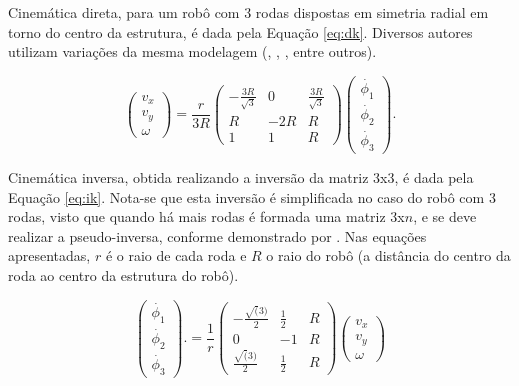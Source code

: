 Cinemática direta, para um robô com 3 rodas dispostas em simetria radial em torno do centro da estrutura, é dada pela Equação \ref{eq:dk}. Diversos autores utilizam variações da mesma modelagem (\cite{rojas2006holonomic}, \cite{ritter2016modelagem}, \cite{pin1994new}, entre outros).

\begin{equation}
  \begin{pmatrix}
    v_x \\
    v_y \\
    \omega
  \end{pmatrix}
  =
  \frac{r}{3R}
  \begin{pmatrix}
    -\frac{3R}{\sqrt{3}} & 0   & \frac{3R}{\sqrt{3}} \\
    R                    & -2R & R                   \\
    1                    & 1   & R
  \end{pmatrix}
  \begin{pmatrix}
    \dot{\phi_1} \\
    \dot{\phi_2} \\
    \dot{\phi_3}
  \end{pmatrix}.
  \label{eq:dk}
\end{equation}

Cinemática inversa, obtida realizando a inversão da matriz 3x3, é dada pela Equação \ref{eq:ik}. Nota-se que esta inversão é simplificada no caso do robô com 3 rodas, visto que quando há mais rodas é formada uma matriz 3x$n$, e se deve realizar a pseudo-inversa, conforme demonstrado por \cite{rojas2006holonomic}. Nas equações apresentadas, $r$ é o raio de cada roda e $R$ o raio do robô (a distância do centro da roda ao centro da estrutura do robô).

\begin{equation}
  \begin{pmatrix}
    \dot{\phi_1} \\
    \dot{\phi_2} \\
    \dot{\phi_3}
  \end{pmatrix}.
  =
  \frac{1}{r}
  \begin{pmatrix}
    -\frac{\sqrt(3)}{2} & \frac{1}{2} & R \\
    0                   & -1          & R \\
    \frac{\sqrt(3)}{2}  & \frac{1}{2} & R
  \end{pmatrix}
  \begin{pmatrix}
    v_x \\
    v_y \\
    \omega
  \end{pmatrix}
  \label{eq:ik}
\end{equation}

